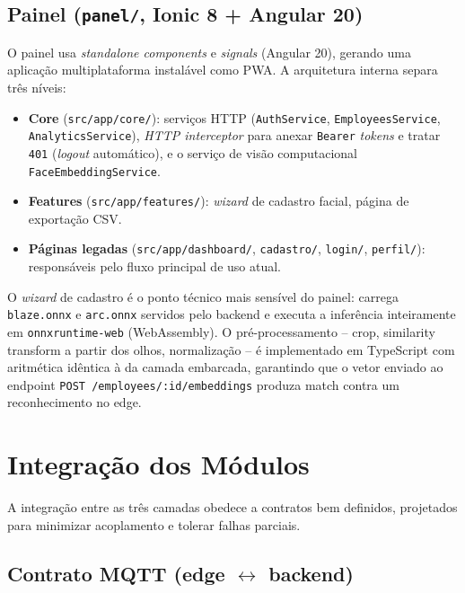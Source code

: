 \documentclass[12pt,a4paper]{report}
\begin{document}
\subsection{Painel (\texttt{panel/}, Ionic 8 + Angular 20)}

O painel usa \textit{standalone components} e \textit{signals} (Angular
20), gerando uma aplicação multiplataforma instalável como PWA. A
arquitetura interna separa três níveis:

\begin{itemize}
    \item \textbf{Core} (\texttt{src/app/core/}): serviços HTTP
        (\texttt{AuthService}, \texttt{EmployeesService},
        \texttt{AnalyticsService}), \textit{HTTP interceptor} para
        anexar \texttt{Bearer} \textit{tokens} e tratar \texttt{401}
        (\textit{logout} automático), e o serviço de visão
        computacional \texttt{FaceEmbeddingService}.
    \item \textbf{Features} (\texttt{src/app/features/}):
        \textit{wizard} de cadastro facial, página de exportação CSV.
    \item \textbf{Páginas legadas} (\texttt{src/app/dashboard/},
        \texttt{cadastro/}, \texttt{login/}, \texttt{perfil/}):
        responsáveis pelo fluxo principal de uso atual.
\end{itemize}

O \textit{wizard} de cadastro é o ponto técnico mais sensível do
painel: carrega \texttt{blaze.onnx} e \texttt{arc.onnx} servidos pelo
backend e executa a inferência inteiramente em
\texttt{onnxruntime-web} (WebAssembly). O pré-processamento -- crop,
similarity transform a partir dos olhos, normalização -- é
implementado em TypeScript com aritmética idêntica à da camada
embarcada, garantindo que o vetor enviado ao endpoint
\texttt{POST /employees/:id/embeddings} produza match contra um
reconhecimento no edge.

\section{Integração dos Módulos}

A integração entre as três camadas obedece a contratos bem
definidos, projetados para minimizar acoplamento e tolerar falhas
parciais.

\subsection{Contrato MQTT (edge $\leftrightarrow$ backend)}
\label{sec:contrato-mqtt}
\end{document}
